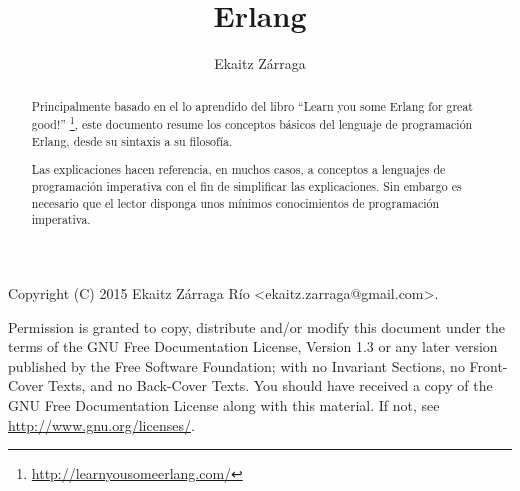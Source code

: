 \documentclass[a4paper,10pt]{article}
\title{Erlang}
\author{Ekaitz Zárraga}
\begin{document}
\maketitle

\begin{abstract}
Principalmente basado en el lo aprendido del libro ``Learn you some Erlang for great good!''
\footnote{\url{http://learnyousomeerlang.com/}}, este documento resume los conceptos básicos del lenguaje de
programación Erlang, desde su sintaxis a su filosofía.

Las explicaciones hacen referencia, en muchos casos, a conceptos a lenguajes de programación imperativa con
el fin de simplificar las explicaciones. Sin embargo es necesario que el lector disponga unos mínimos
conocimientos de programación imperativa.
\end{abstract}

\newpage
Copyright (C)  2015  Ekaitz Zárraga Río \textless ekaitz.zarraga@gmail.com\textgreater.

Permission is granted to copy, distribute and/or modify this document under the terms of the GNU Free
Documentation License, Version 1.3 or any later version published by the Free Software Foundation; with
no Invariant Sections, no Front-Cover Texts, and no Back-Cover Texts. You should have received a copy of
the GNU Free Documentation License along with this material. If not, see \url{http://www.gnu.org/licenses/}.
\newpage

\newpage
  \tableofcontents
\newpage
{}





\end{document}
